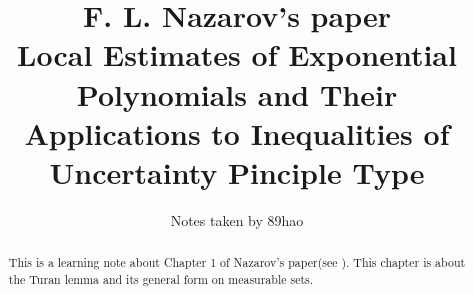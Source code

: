 \documentclass[a4paper,12pt]{article}
\begin{document}
\title{F. L. Nazarov's paper\\
Local Estimates of Exponential Polynomials and Their Applications to Inequalities of Uncertainty Pinciple Type}
\author{\large Notes taken by 89hao}
  
\maketitle
\begin{abstract}
  {This is a learning note about Chapter 1 of Nazarov's paper(see \cite{nazarov1994local}). This chapter is about the Turan lemma and its general form on measurable sets. }
\end{abstract}
\tableofcontents


%
%
\printbibliography
\end{document}
